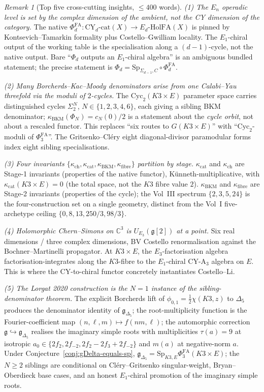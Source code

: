 \documentclass[11pt]{amsart}
\providecommand{\C}{\mathbb{C}}
\providecommand{\g}{\mathfrak{g}}
\providecommand{\gDelta}{\mathfrak{g}_{\Delta_5}}
\providecommand{\HolFA}{\mathrm{HolFA}}
\providecommand{\Sp}{\mathrm{Sp}}
\providecommand{\Cyc}{\mathrm{Cyc}}
\providecommand{\Eone}{E_1}
\providecommand{\Ethree}{E_3}
\providecommand{\Ed}{E_d}
\providecommand{\En}{E_n}
\providecommand{\kch}{\kappa_{\mathrm{ch}}}
\providecommand{\kcat}{\kappa_{\mathrm{cat}}}
\providecommand{\kBKM}{\kappa_{\mathrm{BKM}}}
\providecommand{\kfib}{\kappa_{\mathrm{fibre}}}
\providecommand{\PhiFA}{\Phi^{\mathrm{FA}}}
\theoremstyle{plain}
\theoremstyle{definition}
\theoremstyle{remark}
\newtheorem{remark}[theorem]{Remark}
\begin{document}
\begin{remark}[Top five cross-cutting insights, $\leq 400$ words]
\label{rem:top-five}
\emph{(1) The $\En$ operadic level is set by the complex dimension of
the ambient, not the CY dimension of the category.} The native
$\PhiFA_d:\mathrm{CY}_d\text{-cat}(X)\to\Ed\text{-}\HolFA(X)$
is pinned by Kontsevich--Tamarkin formality plus Costello--Gwilliam
locality. The $\Eone$-chiral output of the working table is the
specialisation along a $(d-1)$-cycle, not the native output. Bare
``$\Phi_d$ outputs an $\Eone$-chiral algebra'' is an ambiguous
bundled statement; the precise statement is
$\Phi_d=\Sp_{\Sigma_{d-1},C}\circ\PhiFA_d$.

\emph{(2) Many Borcherds--Kac--Moody denominators arise from one
Calabi--Yau threefold via the moduli of $2$-cycles.} The
$\Cyc_2(K3\times E)$ parameter space carries distinguished cycles
$\Sigma_2^N$, $N\in\{1,2,3,4,6\}$, each giving a sibling
BKM denominator; $\kBKM(\Phi_N)=c_N(0)/2$ is a statement about the
\emph{cycle orbit}, not about a rescaled functor. This replaces
``six routes to $G(K3\times E)$'' with ``$\Cyc_2$-moduli of
$\PhiFA_3$''. The Gritsenko--Cl\'ery eight diagonal-divisor
paramodular forms index eight sibling specialisations.

\emph{(3) Four invariants $\{\kch,\kcat,\kBKM,\kfib\}$ partition by
stage.}
$\kcat$ and $\kch$ are Stage-1 invariants (properties of the native
functor), K\"unneth-multiplicative, with $\kcat(K3\times E)=0$ (the
total space, not the $K3$ fibre value $2$). $\kBKM$ and $\kfib$ are
Stage-2 invariants (properties of the cycle); the Vol~III spectrum
$\{2,3,5,24\}$ is the four-construction set on a single geometry,
distinct from the Vol~I five-archetype ceiling $\{0,8,13,250/3,98/3\}$.

\emph{(4) Holomorphic Chern--Simons on $\C^3$ is
$U_{\Ethree}(\g[2])$ at a point.} Six real dimensions /
three complex dimensions, BV Costello renormalisation against the
Bochner--Martinelli propagator. At $K3\times E$, the
$\Ethree$-factorisation algebra factorisation-integrates along the
$K3$-fibre to the $\Eone$-chiral CY-A$_3$ algebra on $E$. This is
where the CY-to-chiral functor concretely instantiates Costello--Li.

\emph{(5) The Lorgat 2020 construction is the $N=1$ instance of
the sibling-denominator theorem.} The explicit Borcherds lift of
$\phi_{0,1}=\frac12\chi(K3,z)$ to $\Delta_5$ produces the denominator
identity of $\gDelta$; the root-multiplicity function is the
Fourier-coefficient map $(n,\ell,m)\mapsto f(nm,\ell)$; the
automorphic correction $\g\hookrightarrow\gDelta$ realises the
imaginary simple roots with multiplicities $\tau(a)=9$ at
isotropic $a_0\in\{2f_2,2f_{-2},2f_2-2f_3+2f_{-2}\}$ and $m(a)$ at
negative-norm $a$. Under Conjecture~\ref{conj:gDelta-equals-sp},
$\gDelta=\Sp_{K3,E}\PhiFA_3(K3\times E)$; the $N\geq 2$ siblings are
conditional on Cl\'ery--Gritsenko singular-weight, Bryan--Oberdieck
base cases, and an honest $E_1$-chiral promotion of the imaginary
simple roots.
\end{remark}
\end{document}

